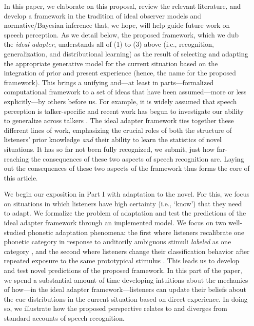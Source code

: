 In this paper, we elaborate on this proposal, review the relevant literature, and develop a framework in the tradition of ideal observer models and normative/Bayesian inference \autocite{Anderson1990} that, we hope, will help guide future work on speech perception. As we detail below, the proposed framework, which we dub the {\em ideal adapter}, understands all of (1) to (3) above (i.e., recognition, generalization, and distributional learning) as the result of selecting and adapting the appropriate generative model for the current situation based on the integration of prior and present experience (hence, the name for the proposed framework). 
This brings a unifying and---at least in parts---formalized computational framework to a set of ideas that have been assumed---more or less explicitly---by others before us. For example, it is widely assumed that speech perception is talker-specific \autocite[e.g.,][]{Creel2011,Pardo2006,Pisoni2007} and recent work has begun to investigate our ability to generalize across talkers \autocite[e.g.,][]{Bradlow2008,Eisner2005,Kraljic2007,Sidaras2009}. The ideal adapter framework ties together these different lines of work, emphasizing 
the crucial roles of both the structure of listeners' prior knowledge \emph{and} their ability to learn the statistics of novel situations. It has so far not been fully recognized, we submit, just how far-reaching the consequences of these two aspects of speech recognition are. Laying out the consequences of these two aspects of the framework thus forms the core of this article.

\label{r2-outline-parts}
We begin our exposition in Part I with adaptation to the novel. For this, we focus on situations in which listeners have high certainty (i.e., `know') that they need to adapt. We formalize the problem of adaptation and test the predictions of the ideal adapter framework through an implemented model.  We focus on two well-studied phonetic adaptation phenomena: the first where listeners recalibrate one phonetic category in response to auditorily ambiguous stimuli {\em labeled} as one category \autocite[perceptual recalibration or phonetic adaptation,][]{Bertelson2003,Kraljic2005,Norris2003}, and the second where listeners change their classification behavior after repeated exposure to the same prototypical stimulus \autocite[selective adaptation,][]{Eimas1973,Samuel1986}. This leads us to develop and test novel predictions of the proposed framework. In this part of the paper, we spend a substantial amount of time developing intuitions about the mechanics of how---in the ideal adapter framework---listeners can update their beliefs about the cue distributions in the current situation based on direct experience. In doing so, we illustrate how the proposed perspective relates to and diverges from standard accounts of speech recognition.

